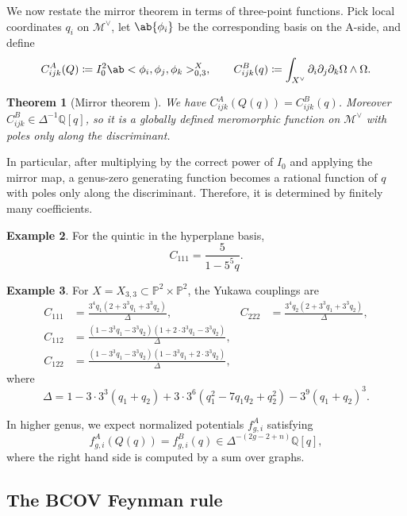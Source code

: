 \documentclass{amsart}
\newtheorem{thm}{Theorem}[section]
\theoremstyle{definition}
\newtheorem{exm}[thm]{Example}
\theoremstyle{remark}
\theoremstyle{plain}
\theoremstyle{definition}
\theoremstyle{remark}
\newcommand{\Q}{\mathbb{Q}}
\renewcommand{\P}{\mathbb{P}}
\newcommand{\mc}[1]{\mathcal{#1}}
\newcommand{\1}{\mathbf{1}}
\newcommand{\2}{\mathbf{2}}
\newcommand{\3}{\mathbf{3}}
\begin{document}
We now restate the mirror theorem in terms of three-point functions. Pick local coordinates \(q_i\) on \(\mc{M}^{\vee}\), let \(\ab\{\phi_i\}\) be the corresponding basis on the A-side, and define
\[ C^A_{ijk}(Q) \coloneqq I_0^2 \ab<\phi_i, \phi_j, \phi_k>^X_{0,3}, \qquad C^B_{ijk}(q) \coloneqq \int_{X^{\vee}} \partial_i \partial_j \partial_k \Omega \wedge \Omega. \]

\begin{thm}[Mirror theorem {\cite{Givental1998,LLY1997}}]
    We have \(C^A_{ijk}(Q(q)) = C^B_{ijk}(q)\). Moreover \(C^B_{ijk} \in \Delta^{-1}\Q[q]\), so it is a globally defined meromorphic function on \(\mc{M}^{\vee}\) with poles only along the discriminant.
\end{thm}

In particular, after multiplying by the correct power of \(I_0\) and applying the mirror map, a genus-zero generating function becomes a rational function of \(q\) with poles only along the discriminant. Therefore, it is determined by finitely many coefficients.

\begin{exm}
    For the quintic in the hyperplane basis,
    \[ C_{111} = \frac{5}{1-5^5 q}. \]
\end{exm}

\begin{exm}
    For \(X = X_{3,3} \subset \P^2 \times \P^2\), the Yukawa couplings are
    \begin{align*}
        C_{111} &= \frac{3^4 q_1 (2+3^3q_1+3^3q_2)}{\Delta}, & C_{222} &= \frac{3^4 q_2(2+3^3q_1+3^3q_2)}{\Delta}, \\
        C_{112} &= \frac{(1-3^3q_1-3^3q_2)(1+2\cdot 3^3 q_1 - 3^3 q_2)}{\Delta}, \\
        C_{122} &= \frac{(1-3^3q_1-3^3q_2)(1-3^3q_1+2\cdot3^3q_2)}{\Delta},
    \end{align*}
    where
    \[ \Delta = 1 - 3\cdot3^3(q_1+q_2) + 3\cdot3^6(q_1^2 - 7q_1q_2+q_2^2) - 3^9(q_1+q_2)^3. \]
\end{exm}

In higher genus, we expect normalized potentials \(f^A_{g,i}\) satisfying
\[ f^A_{g,i}(Q(q)) = f^B_{g,i}(q) \in \Delta^{-(2g-2+n)}\Q[q], \]
where the right hand side is computed by a sum over graphs.

\subsection{The BCOV Feynman rule}%
\label{sub:The BCOV Feynman rule}
\end{document}
